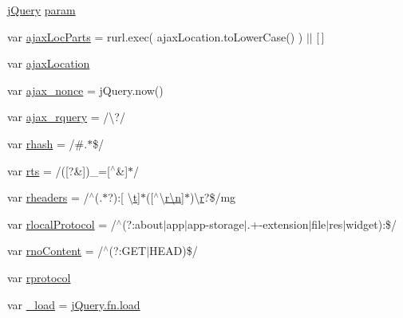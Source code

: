 \begin{DoxyCompactItemize}
\item 
\hyperlink{_scripts_2jquery-1_810_82_8js_a41c2e1bff4a6b292938143764e31d789}{j\+Query} \hyperlink{_scripts_2jquery-1_810_82_8js_a24ced9cd3c9e1970a8cbe8d7adedc765}{param}
\item 
var \hyperlink{_scripts_2jquery-1_810_82_8js_a4c35110da3c335cfca38505ee65a5e79}{ajax\+Loc\+Parts} = rurl.\+exec( ajax\+Location.\+to\+Lower\+Case() ) $\vert$$\vert$ \mbox{[}$\,$\mbox{]}
\item 
var \hyperlink{_scripts_2jquery-1_810_82_8js_a1661d4e1676e7c6ffde5a3cb8d8ae246}{ajax\+Location}
\item 
var \hyperlink{_scripts_2jquery-1_810_82_8js_aaa43e6d4c76ee8be878dd7e93fb755a4}{ajax\+\_\+nonce} = j\+Query.\+now()
\item 
var \hyperlink{_scripts_2jquery-1_810_82_8js_a4da85c0011217bf1643139dc23999c5c}{ajax\+\_\+rquery} = /\textbackslash{}?/
\item 
var \hyperlink{_scripts_2jquery-1_810_82_8js_a6990b6955b6bec9dd39f3814cfb56d6d}{rhash} = /\#.$\ast$\$/
\item 
var \hyperlink{_scripts_2jquery-1_810_82_8js_a38ff30904f54277281a13514d7aea00d}{rts} = /(\mbox{[}?\&\mbox{]})\+\_\+=\mbox{[}$^\wedge$\&\mbox{]}$\ast$/
\item 
var \hyperlink{_scripts_2jquery-1_810_82_8js_af506d11612139f03091db71089d92e8b}{rheaders} = /$^\wedge$(.$\ast$?)\+:\mbox{[} \textbackslash{}\hyperlink{_scripts_2jquery_8validate_8min_8js_a23c5666e83bbbceee94adcd0851f50c4}{t}\mbox{]}$\ast$(\mbox{[}$^\wedge$\textbackslash{}\hyperlink{_scripts_2ai_80_822_89-build00167_8min_8js_afc984c4f6c68ce30a0af99006f5f8d27}{r\textbackslash{}n}\mbox{]}$\ast$)\textbackslash{}\hyperlink{_scripts_2ai_80_822_89-build00167_8min_8js_a07c0e0a63b5b484807c0331c78558c9e}{r}?\$/mg
\item 
var \hyperlink{_scripts_2jquery-1_810_82_8js_af4dd13c90298bbf53ce08ec707dc9e2a}{rlocal\+Protocol} = /$^\wedge$(?\+:about$\vert$app$\vert$app-\/storage$\vert$.+-\/extension$\vert$file$\vert$res$\vert$widget)\+:\$/
\item 
var \hyperlink{_scripts_2jquery-1_810_82_8js_a537d744d72e31ec312aa3f16ef576d3f}{rno\+Content} = /$^\wedge$(?\+:G\+ET$\vert$H\+E\+AD)\$/
\item 
var \hyperlink{_scripts_2jquery-1_810_82_8js_a0f02b710647fcf95e74593954fb9b4cb}{rprotocol}
\item 
var \hyperlink{_scripts_2jquery-1_810_82_8js_ab9d9919a16b6ef96017991e55a3a9e6c}{\+\_\+load} = \hyperlink{_scripts_2jquery-1_810_82_8js_a8d0b9ec82c308161432f1c387d2fc2a7}{j\+Query.\+fn.\+load}
$$
\end{DoxyCompactItemize}
